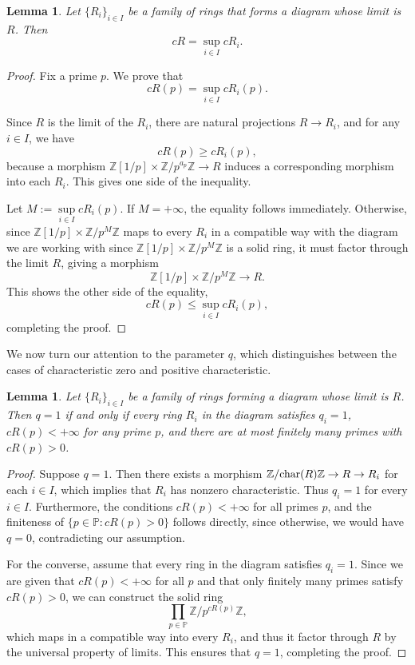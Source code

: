 \documentclass{amsart}
\newtheorem{lemma}[subsection]{Lemma}
\newcommand{\chara}{{\textup{char}}}
\newcommand{\Z}{{\mathbb Z}}
\renewcommand{\P}{{\mathbb P}}
\begin{document}
    \begin{lemma}
    \label{lm:limit_c}
        Let $\{R_i\}_{i \in I}$ be a family of rings that forms a diagram whose limit is $R$.
        Then
        $$
        cR = \sup\limits_{i \in I} cR_i.
        $$
    \end{lemma}
    \begin{proof}
        Fix a prime $p$.
        We prove that
        $$
        cR(p) = \sup\limits_{i \in I} cR_i(p).
        $$

        Since $R$ is the limit of the $R_i$, there are natural projections $R \to R_i$, and for any $i \in I$, we have
        $$
        cR(p) \geq cR_i(p),
        $$
        because a morphism $\Z[1/p] \times \Z/p^{a_p}\Z \to R$ induces a corresponding morphism into each $R_i$.
        This gives one side of the inequality.

        Let $M :=\sup\limits_{i \in I} cR_i(p)$.
        If  $M = +\infty$, the equality follows immediately.
        Otherwise, since $\Z[1/p] \times \Z/p^M\Z$ maps to every $R_i$ in a compatible way with the diagram we are working with since $\Z[1/p] \times \Z/p^M\Z$ is a solid ring, it must factor through the limit $R$, giving a morphism 
        $$
        \Z[1/p] \times \Z/p^M\Z \to R.
        $$
        This shows the other side of the equality,
        $$
        cR(p) \leq \sup\limits_{i \in I} cR_i(p),
        $$
        completing the proof.
    \end{proof}

    We now turn our attention to the parameter $q$, which distinguishes between the cases of characteristic zero and positive characteristic.
    
    \begin{lemma}
    \label{lm:limit_q}
        Let $\{R_i\}_{i \in I}$ be a family of rings forming a diagram whose limit is $R$.
        Then $q = 1$ if and only if every ring $R_i$ in the diagram satisfies $q_i = 1$, $cR(p) < +\infty$ for any prime $p$, and there are at most finitely many primes with $cR(p) > 0$.
    \end{lemma}
    \begin{proof}
        Suppose $q = 1$.
        Then there exists a morphism $\Z/\chara(R)\Z \to R \to R_i$ for each $i \in I$, which implies that $R_i$ has nonzero characteristic.
        Thus $q_i = 1$ for every $i \in I$.
        Furthermore, the conditions $cR(p) < +\infty$ for all primes $p$, and the finiteness of $\{p \in \P : cR(p) > 0\}$ follows directly, since otherwise, we would have $q = 0$, contradicting our assumption.
        
        For the converse, assume that every ring in the diagram satisfies $q_i = 1$.  
        Since we are given that $cR(p) < +\infty$ for all $p$ and that only finitely many primes satisfy $cR(p) > 0$, we can construct the solid ring  
        $$
        \prod\limits_{p \in \P} \Z/p^{cR(p)}\Z,
        $$
        which maps in a compatible way into every $R_i$, and thus it factor through $R$ by the universal property of limits.  
        This ensures that $q = 1$, completing the proof.
    \end{proof}
    
\end{document}
